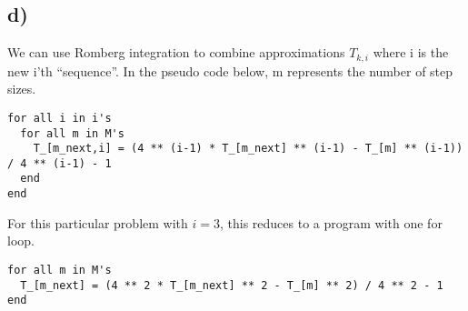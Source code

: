 \documentclass[12pt]{article}
\begin{document}
\subsection*{d)}
We can use Romberg integration to combine approximations $T_{k,i}$ where i is the new i'th ``sequence''. In the pseudo code below, m represents the number of step sizes.
\begin{lstlisting}
for all i in i's
  for all m in M's
    T_[m_next,i] = (4 ** (i-1) * T_[m_next] ** (i-1) - T_[m] ** (i-1)) / 4 ** (i-1) - 1
  end
end
\end{lstlisting}
For this particular problem with $i=3$, this reduces to a program with one for loop.
\begin{lstlisting}
for all m in M's
  T_[m_next] = (4 ** 2 * T_[m_next] ** 2 - T_[m] ** 2) / 4 ** 2 - 1
end
\end{lstlisting}
\end{document}
